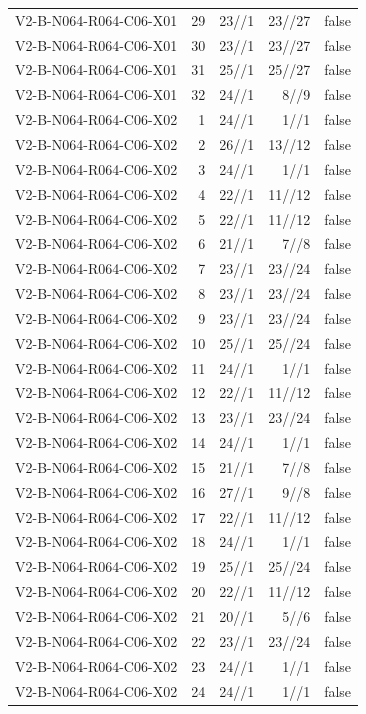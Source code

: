 {\begin{longtable}{lrrrr}
V2-B-N064-R064-C06-X01 & 29 & 23//1 & 23//27 & false \\
V2-B-N064-R064-C06-X01 & 30 & 23//1 & 23//27 & false \\
V2-B-N064-R064-C06-X01 & 31 & 25//1 & 25//27 & false \\
V2-B-N064-R064-C06-X01 & 32 & 24//1 & 8//9 & false \\
V2-B-N064-R064-C06-X02 & 1 & 24//1 & 1//1 & false \\
V2-B-N064-R064-C06-X02 & 2 & 26//1 & 13//12 & false \\
V2-B-N064-R064-C06-X02 & 3 & 24//1 & 1//1 & false \\
V2-B-N064-R064-C06-X02 & 4 & 22//1 & 11//12 & false \\
V2-B-N064-R064-C06-X02 & 5 & 22//1 & 11//12 & false \\
V2-B-N064-R064-C06-X02 & 6 & 21//1 & 7//8 & false \\
V2-B-N064-R064-C06-X02 & 7 & 23//1 & 23//24 & false \\
V2-B-N064-R064-C06-X02 & 8 & 23//1 & 23//24 & false \\
V2-B-N064-R064-C06-X02 & 9 & 23//1 & 23//24 & false \\
V2-B-N064-R064-C06-X02 & 10 & 25//1 & 25//24 & false \\
V2-B-N064-R064-C06-X02 & 11 & 24//1 & 1//1 & false \\
V2-B-N064-R064-C06-X02 & 12 & 22//1 & 11//12 & false \\
V2-B-N064-R064-C06-X02 & 13 & 23//1 & 23//24 & false \\
V2-B-N064-R064-C06-X02 & 14 & 24//1 & 1//1 & false \\
V2-B-N064-R064-C06-X02 & 15 & 21//1 & 7//8 & false \\
V2-B-N064-R064-C06-X02 & 16 & 27//1 & 9//8 & false \\
V2-B-N064-R064-C06-X02 & 17 & 22//1 & 11//12 & false \\
V2-B-N064-R064-C06-X02 & 18 & 24//1 & 1//1 & false \\
V2-B-N064-R064-C06-X02 & 19 & 25//1 & 25//24 & false \\
V2-B-N064-R064-C06-X02 & 20 & 22//1 & 11//12 & false \\
V2-B-N064-R064-C06-X02 & 21 & 20//1 & 5//6 & false \\
V2-B-N064-R064-C06-X02 & 22 & 23//1 & 23//24 & false \\
V2-B-N064-R064-C06-X02 & 23 & 24//1 & 1//1 & false \\
V2-B-N064-R064-C06-X02 & 24 & 24//1 & 1//1 & false \\

\end{longtable}}
